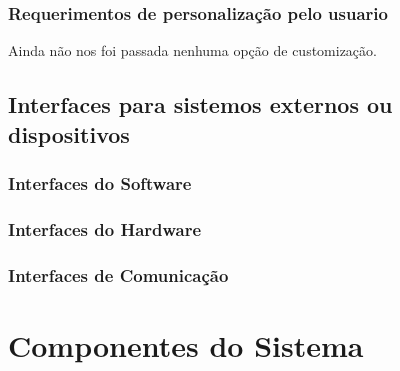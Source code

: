\documentclass[11pt, a4paper]{article}
\begin{document}
			\subsubsection{Requerimentos de personalização pelo usuario}
				Ainda não nos foi passada nenhuma opção de customização.

		\subsection{Interfaces para sistemos externos ou dispositivos}
			\subsubsection{Interfaces do Software}
			
			\subsubsection{Interfaces do Hardware}
			
			\subsubsection{Interfaces de Comunicação}
			
	\section{Componentes do Sistema}
\end{document}
